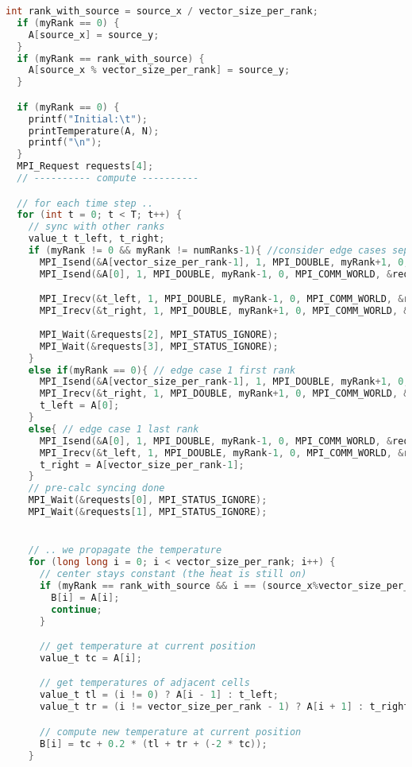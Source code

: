 \documentclass[UTF-8]{article}
\begin{document}
\begin{itemize}
\begin{enumerate}[label=\textbf{\arabic *)}]
\begin{lstlisting}[language=c]
  int rank_with_source = source_x / vector_size_per_rank;
  if (myRank == 0) {
    A[source_x] = source_y;
  }
  if (myRank == rank_with_source) {
    A[source_x % vector_size_per_rank] = source_y;
  }

  if (myRank == 0) {
    printf("Initial:\t");
    printTemperature(A, N);
    printf("\n");
  }
  MPI_Request requests[4];
  // ---------- compute ----------

  // for each time step ..
  for (int t = 0; t < T; t++) {
    // sync with other ranks
    value_t t_left, t_right;
    if (myRank != 0 && myRank != numRanks-1){ //consider edge cases separatelly
      MPI_Isend(&A[vector_size_per_rank-1], 1, MPI_DOUBLE, myRank+1, 0, MPI_COMM_WORLD, &requests[0]);
      MPI_Isend(&A[0], 1, MPI_DOUBLE, myRank-1, 0, MPI_COMM_WORLD, &requests[1]);

      MPI_Irecv(&t_left, 1, MPI_DOUBLE, myRank-1, 0, MPI_COMM_WORLD, &requests[2]);
      MPI_Irecv(&t_right, 1, MPI_DOUBLE, myRank+1, 0, MPI_COMM_WORLD, &requests[3]);
      
      MPI_Wait(&requests[2], MPI_STATUS_IGNORE);
      MPI_Wait(&requests[3], MPI_STATUS_IGNORE);
    }
    else if(myRank == 0){ // edge case 1 first rank
      MPI_Isend(&A[vector_size_per_rank-1], 1, MPI_DOUBLE, myRank+1, 0, MPI_COMM_WORLD, &requests[0]);
      MPI_Irecv(&t_right, 1, MPI_DOUBLE, myRank+1, 0, MPI_COMM_WORLD, &requests[1]);
      t_left = A[0];
    }
    else{ // edge case 1 last rank
      MPI_Isend(&A[0], 1, MPI_DOUBLE, myRank-1, 0, MPI_COMM_WORLD, &requests[0]);
      MPI_Irecv(&t_left, 1, MPI_DOUBLE, myRank-1, 0, MPI_COMM_WORLD, &requests[1]);
      t_right = A[vector_size_per_rank-1];
    }
    // pre-calc syncing done
    MPI_Wait(&requests[0], MPI_STATUS_IGNORE);
    MPI_Wait(&requests[1], MPI_STATUS_IGNORE);


    // .. we propagate the temperature
    for (long long i = 0; i < vector_size_per_rank; i++) {
      // center stays constant (the heat is still on)
      if (myRank == rank_with_source && i == (source_x%vector_size_per_rank)) {
        B[i] = A[i];
        continue;
      }

      // get temperature at current position
      value_t tc = A[i];

      // get temperatures of adjacent cells
      value_t tl = (i != 0) ? A[i - 1] : t_left;
      value_t tr = (i != vector_size_per_rank - 1) ? A[i + 1] : t_right;

      // compute new temperature at current position
      B[i] = tc + 0.2 * (tl + tr + (-2 * tc));
    }


\end{lstlisting}
\end{enumerate}
\end{itemize}
\end{document}
